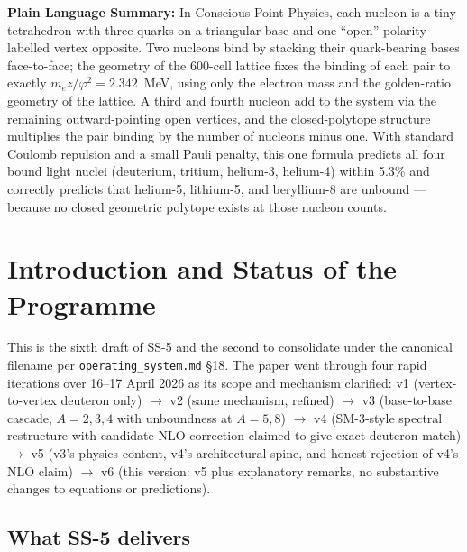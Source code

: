 \documentclass[11pt,letterpaper]{article}
\newcommand{\phig}{\varphi}
\begin{document}
\bigskip\noindent
\textbf{Plain Language Summary:}
In Conscious Point Physics, each nucleon is a tiny tetrahedron with three quarks on a triangular base and one ``open'' polarity-labelled vertex opposite. Two nucleons bind by stacking their quark-bearing bases face-to-face; the geometry of the 600-cell lattice fixes the binding of each pair to exactly $m_e z/\phig^2 = 2.342$~MeV, using only the electron mass and the golden-ratio geometry of the lattice. A third and fourth nucleon add to the system via the remaining outward-pointing open vertices, and the closed-polytope structure multiplies the pair binding by the number of nucleons minus one. With standard Coulomb repulsion and a small Pauli penalty, this one formula predicts all four bound light nuclei (deuterium, tritium, helium-3, helium-4) within 5.3\% and correctly predicts that helium-5, lithium-5, and beryllium-8 are unbound --- because no closed geometric polytope exists at those nucleon counts.

\bigskip
\raggedright
\tableofcontents
\newpage

\section{Introduction and Status of the Programme}
\label{sec:intro}

This is the sixth draft of SS-5 and the second to consolidate under the canonical filename per \texttt{operating\_system.md} §18. The paper went through four rapid iterations over 16--17 April 2026 as its scope and mechanism clarified: v1 (vertex-to-vertex deuteron only) $\to$ v2 (same mechanism, refined) $\to$ v3 (base-to-base cascade, $A = 2, 3, 4$ with unboundness at $A = 5, 8$) $\to$ v4 (SM-3-style spectral restructure with candidate NLO correction claimed to give exact deuteron match) $\to$ v5 (v3's physics content, v4's architectural spine, and honest rejection of v4's NLO claim) $\to$ v6 (this version: v5 plus explanatory remarks, no substantive changes to equations or predictions).

\subsection{What SS-5 delivers}
\end{document}
